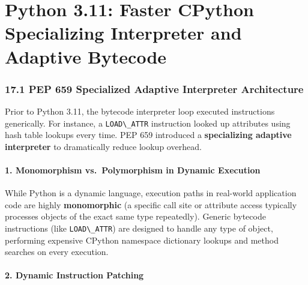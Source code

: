 \hypertarget{python-3.11-faster-cpython-specializing-interpreter-and-adaptive-bytecode}{%
\chapter{Python 3.11: Faster CPython Specializing Interpreter and
Adaptive
Bytecode}\label{python-3.11-faster-cpython-specializing-interpreter-and-adaptive-bytecode}}

\hypertarget{pep-659-specialized-adaptive-interpreter-architecture}{%
\subsection{17.1 PEP 659 Specialized Adaptive Interpreter
Architecture}\label{pep-659-specialized-adaptive-interpreter-architecture}}

Prior to Python 3.11, the bytecode interpreter loop executed
instructions generically. For instance, a
\passthrough{\lstinline!LOAD\_ATTR!} instruction looked up attributes
using hash table lookups every time. PEP 659 introduced a
\textbf{specializing adaptive interpreter} to dramatically reduce lookup
overhead.

\hypertarget{monomorphism-vs.-polymorphism-in-dynamic-execution}{%
\subsubsection{1. Monomorphism vs.~Polymorphism in Dynamic
Execution}\label{monomorphism-vs.-polymorphism-in-dynamic-execution}}

While Python is a dynamic language, execution paths in real-world
application code are highly \textbf{monomorphic} (a specific call site
or attribute access typically processes objects of the exact same type
repeatedly). Generic bytecode instructions (like
\passthrough{\lstinline!LOAD\_ATTR!}) are designed to handle any type of
object, performing expensive CPython namespace dictionary lookups and
method searches on every execution.

\hypertarget{dynamic-instruction-patching}{%
\subsubsection{2. Dynamic Instruction
Patching}\label{dynamic-instruction-patching}}

